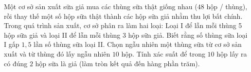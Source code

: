 \begin{bt}%
	Một cơ sở sản xuất sữa giả mua các thùng sữa thật giống nhau ($48$ hộp / thùng), rồi thay thế một số hộp sữa thật thành các hộp sữa giả nhằm thu lợi bất chính.  Trong quá trình sản xuất, cơ sở phân ra làm hai loại: Loại I để lẫn mỗi thùng 5 hộp sữa giả và loại II để lẫn mỗi thùng $3$ hộp sữa giả. Biết rằng số thùng sữa loại I gấp $1{,}5$ lần số thùng sữa loại II. Chọn ngẫu nhiên một thùng sữa từ cơ sở sản xuất và từ thùng đó lấy ngẫu nhiên $10$ hộp. Tính xác suất để trong $10$ hộp lấy ra có đúng $2$ hộp sữa là giả (làm tròn kết quả đến hàng phần trăm).
\end{bt}

